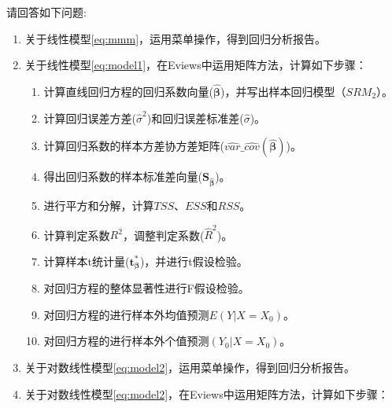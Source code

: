 \documentclass[12pt,(landscape,a4paper),(portrait,a4paper)]{article}
\providecommand{\tightlist}{%
  \setlength{\itemsep}{0pt}\setlength{\parskip}{0pt}}
\begin{document}
请回答如下问题:

\begin{enumerate}
\def\labelenumi{\alph{enumi}.}
\item
  关于线性模型\eqref{eq:mmm}，运用菜单操作，得到回归分析报告。\\
\item
  关于线性模型\eqref{eq:model1}，在Eviews中运用矩阵方法，计算如下步骤：

  \begin{enumerate}
  \def\labelenumii{\arabic{enumii}.}
  \tightlist
  \item
    计算直线回归方程的回归系数向量(\(\mathbf{\hat{\beta}}\))，并写出样本回归模型（\(SRM_2\)）。\\
  \item
    计算回归误差方差(\(\hat{\sigma}^2\))和回归误差标准差(\(\hat{\sigma}\))。\\
  \item
    计算回归系数的样本方差协方差矩阵(\(\widehat{var}\_\widehat{cov}(\mathbf{\hat{\beta}})\))。\\
  \item
    得出回归系数的样本标准差向量(\(\mathbf{S_{\hat{\beta}}}\))。\\
  \item
    进行平方和分解，计算\(TSS\)、\(ESS\)和\(RSS\)。\\
  \item
    计算判定系数\(R^2\)，调整判定系数(\(\hat{R}^2\))。\\
  \item
    计算样本t统计量(\(\mathbf{t^{\ast}_{\beta}}\))，并进行t假设检验。\\
  \item
    对回归方程的整体显著性进行F假设检验。\\
  \item
    对回归方程的进行样本外均值预测\(E(Y|X=X_0)\)。\\
  \item
    对回归方程的进行样本外个值预测\((Y_0|X=X_0)\)。\\
  \end{enumerate}
\item
  关于对数线性模型\eqref{eq:model2}，运用菜单操作，得到回归分析报告。\\
\item
  关于对数线性模型\eqref{eq:model2}，在Eviews中运用矩阵方法，计算如下步骤：


\end{enumerate}
\end{document}
